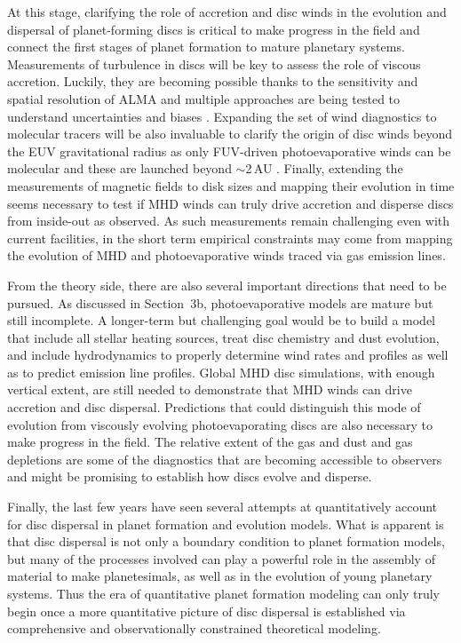 \documentclass{rsos}
\begin{document}
At this stage, clarifying the role of accretion and disc winds in the evolution and dispersal of planet-forming discs is critical to make progress in the field and connect the first stages of planet formation to mature planetary systems.
Measurements of turbulence in discs will be key to assess the role of viscous accretion. Luckily, they are becoming possible thanks to the sensitivity and spatial resolution of ALMA and multiple approaches are being tested to understand uncertainties and biases 
\cite{2016MNRAS.460.2779C}. Expanding the set of wind diagnostics to molecular tracers will be also invaluable to clarify the origin of disc winds beyond the EUV gravitational radius as only FUV-driven photoevaporative winds can be molecular and these are launched beyond $\sim$2\,AU \cite{2009ApJ...705.1237G}. Finally, extending the measurements of magnetic fields to disk sizes and mapping their evolution in time seems necessary to test if MHD winds can truly drive accretion and disperse discs from inside-out as observed. As such measurements remain challenging even with current facilities, in the short term empirical constraints may come from mapping the evolution of MHD and photoevaporative winds traced via gas emission lines. 

From the theory side, there are also several important directions that need to be pursued. As discussed in Section~3b, photoevaporative models are mature but still incomplete. A longer-term but challenging goal would be to build a model that include all stellar heating sources, treat disc chemistry and dust evolution, and include 
hydrodynamics to properly determine wind rates and profiles as well as to predict emission line profiles. Global MHD disc simulations, with enough vertical extent, are still needed to demonstrate that MHD winds can drive accretion and disc dispersal. Predictions that could distinguish this mode of evolution from viscously evolving photoevaporating discs are also necessary to make progress in the field. The relative extent of the gas and dust and gas depletions are some of the diagnostics that are becoming  accessible to observers and might be promising to establish how discs evolve and disperse.

Finally, the last few  years have seen several attempts at quantitatively account for disc dispersal in planet formation and evolution models. What is apparent is that disc dispersal is not only a boundary condition to planet formation models, but many of the processes involved can play a powerful role in the assembly of material to make planetesimals, as well as in the evolution of young planetary systems.  Thus the era of quantitative planet formation modeling can only truly begin once a more quantitative picture of disc dispersal is established via comprehensive and observationally constrained theoretical modeling. 
\end{document}
